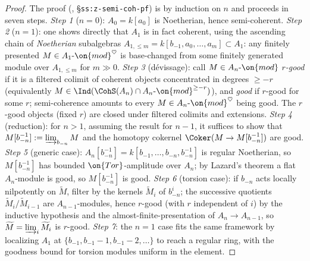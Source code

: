 \begin{proof}
  The proof (\cite{hilburn-raskin}, \S\texttt{ss:z-semi-coh-pf}) is by
  induction on $n$ and proceeds in seven steps.
  \emph{Step 1} ($n=0$): $A_0 = k[a_0]$ is Noetherian, hence semi-coherent.
  \emph{Step 2} ($n=1$): one shows directly that $A_1$ is in fact coherent,
  using the ascending chain of \emph{Noetherian} subalgebras
  $A_{1,\leq m} = k[b_{-1}, a_0, \ldots, a_m] \subset A_1$: any finitely
  presented $M \in A_1\text{-}\on{mod}^\heartsuit$ is base-changed from some
  finitely generated module over $A_{1,\leq m}$ for $m \gg 0$.
  \emph{Step 3} (d\'evissage): call $M \in A_n\text{-}\on{mod}$ \emph{$r$-good}
  if it is a filtered colimit of coherent objects concentrated in degrees
  $\geq -r$ (equivalently $M \in \Ind(\CohS(A_n)\cap A_n\text{-}\on{mod}^{\geq -r})$),
  and \emph{good} if $r$-good for some $r$; semi-coherence amounts to every
  $M \in A_n\text{-}\on{mod}^{\heartsuit}$ being good. The $r$-good objects
  (fixed $r$) are closed under filtered colimits and extensions.
  \emph{Step 4} (reduction): for $n > 1$, assuming the result for $n-1$, it
  suffices to show that $M[b_{-n}^{-1}] := \varinjlim_{b_{-n}} M$ and the
  homotopy cokernel $\Coker(M \to M[b_{-n}^{-1}])$ are good.
  \emph{Step 5} (generic case): $A_n[b_{-n}^{-1}] = k[b_{-1},\ldots,b_{-n},b_{-n}^{-1}]$
  is regular Noetherian, so $M[b_{-n}^{-1}]$ has bounded $\on{Tor}$-amplitude
  over $A_n$; by Lazard's theorem a flat $A_n$-module is good, so
  $M[b_{-n}^{-1}]$ is good.
  \emph{Step 6} (torsion case): if $b_{-n}$ acts locally nilpotently on
  $\widetilde{M}$, filter by the kernels $\widetilde{M}_i$ of $b_{-n}^i$; the
  successive quotients $\widetilde{M}_i/\widetilde{M}_{i-1}$ are
  $A_{n-1}$-modules, hence $r$-good (with $r$ independent of $i$) by the
  inductive hypothesis and the almost-finite-presentation of
  $A_n \to A_{n-1}$, so $\widetilde{M} = \varinjlim_i \widetilde{M}_i$ is $r$-good.
  \emph{Step 7}: the $n=1$ case fits the same framework by localizing $A_1$ at
  $\{b_{-1}, b_{-1}-1, b_{-1}-2, \ldots\}$ to reach a regular ring, with the
  goodness bound for torsion modules uniform in the element.
\end{proof}


